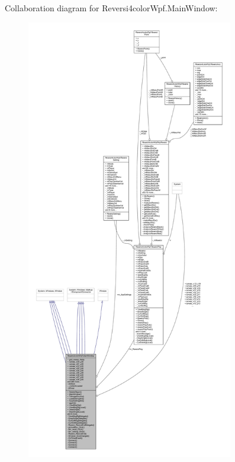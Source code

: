 Collaboration diagram for Reversi4color\+Wpf.\+Main\+Window\+:
\nopagebreak
\begin{figure}[H]
\begin{center}
\leavevmode
\includegraphics[height=550pt]{class_reversi4color_wpf_1_1_main_window__coll__graph}
\end{center}
\end{figure}
